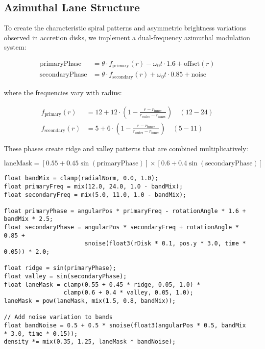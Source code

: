 \documentclass[12pt,a4paper]{article}
\theoremstyle{definition}
\theoremstyle{remark}
\begin{document}
\subsection{Azimuthal Lane Structure}

To create the characteristic spiral patterns and asymmetric brightness variations observed in accretion disks, we implement a dual-frequency azimuthal modulation system:

\begin{align}
    \text{primaryPhase} &= \theta \cdot f_{\text{primary}}(r) - \omega_0 t \cdot 1.6 + \text{offset}(r) \\
    \text{secondaryPhase} &= \theta \cdot f_{\text{secondary}}(r) + \omega_0 t \cdot 0.85 + \text{noise}
\end{align}

where the frequencies vary with radius:

\begin{align}
    f_{\text{primary}}(r) &= 12 + 12 \cdot \left(1 - \frac{r - r_{\text{inner}}}{r_{\text{outer}} - r_{\text{inner}}}\right) \quad (12-24) \\
    f_{\text{secondary}}(r) &= 5 + 6 \cdot \left(1 - \frac{r - r_{\text{inner}}}{r_{\text{outer}} - r_{\text{inner}}}\right) \quad (5-11)
\end{align}

These phases create ridge and valley patterns that are combined multiplicatively:

\begin{equation}
    \text{laneMask} = \left[0.55 + 0.45 \sin(\text{primaryPhase})\right] \times \left[0.6 + 0.4 \sin(\text{secondaryPhase})\right]
\end{equation}

\begin{lstlisting}[style=metalstyle, caption=Azimuthal banding implementation]
float bandMix = clamp(radialNorm, 0.0, 1.0);
float primaryFreq = mix(12.0, 24.0, 1.0 - bandMix);
float secondaryFreq = mix(5.0, 11.0, 1.0 - bandMix);

float primaryPhase = angularPos * primaryFreq - rotationAngle * 1.6 + bandMix * 2.5;
float secondaryPhase = angularPos * secondaryFreq + rotationAngle * 0.85 + 
                       snoise(float3(rDisk * 0.1, pos.y * 3.0, time * 0.05)) * 2.0;

float ridge = sin(primaryPhase);
float valley = sin(secondaryPhase);
float laneMask = clamp(0.55 + 0.45 * ridge, 0.05, 1.0) * 
                 clamp(0.6 + 0.4 * valley, 0.05, 1.0);
laneMask = pow(laneMask, mix(1.5, 0.8, bandMix));

// Add noise variation to bands
float bandNoise = 0.5 + 0.5 * snoise(float3(angularPos * 0.5, bandMix * 3.0, time * 0.15));
density *= mix(0.35, 1.25, laneMask * bandNoise);
\end{lstlisting}
\end{document}

